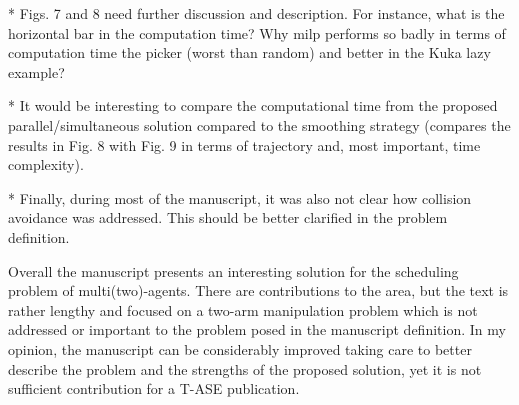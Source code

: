 \documentclass[journal]{IEEEtran}
\begin{document}
	\begin{partt}
		* Figs. 7 and 8 need further discussion and description.  For instance, what is the horizontal bar in the computation time? Why milp performs so badly in terms of computation time the picker (worst than random) and better in the Kuka lazy example?  
	\end{partt}
	
	\begin{partt}
		* It would be interesting to compare the computational time from the proposed parallel/simultaneous solution compared to the smoothing strategy (compares the results in Fig. 8 with Fig. 9 in terms of trajectory and, most important, time complexity).
	\end{partt}
	
	\begin{partt}
		* Finally, during most of the manuscript, it was also not clear how collision avoidance was addressed.  This should be better clarified in the problem definition.
	\end{partt}
	
	\begin{partt}
		
		Overall the manuscript presents an interesting solution for the scheduling problem of multi(two)-agents. There are contributions to the area, but the text is rather lengthy and focused on a two-arm manipulation problem which is not addressed or important to the problem posed in the manuscript definition. In my opinion, the manuscript can be considerably improved taking care to better describe the problem and the strengths of the proposed solution, yet it is not sufficient contribution for a T-ASE publication.  
	\end{partt}
	
	\vspace{0.5in}
	
\end{document}
